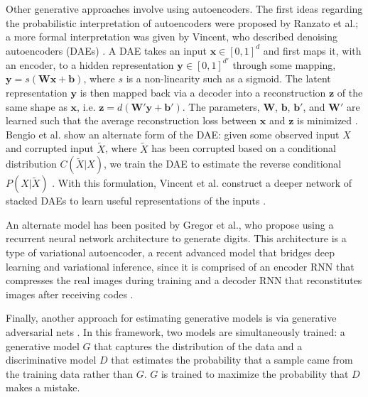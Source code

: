 \documentclass[10pt,twocolumn,letterpaper]{article}
\begin{document}
Other generative approaches involve using autoencoders. The first ideas regarding the probabilistic interpretation of autoencoders were proposed by Ranzato et al.; a more formal interpretation was given by Vincent, who described denoising autoencoders (DAEs) \cite{marc2007efficient} \cite{vincent2011connection}. A DAE takes an input $\mathbf{x} \in [0,1]^d$ and first maps it, with an encoder, to a hidden representation $\mathbf{y} \in [0,1]^{d'}$ through some mapping, $\mathbf{y} = s(\mathbf{W}\mathbf{x} + \mathbf{b})$, where $s$ is a non-linearity such as a sigmoid. The latent representation $\mathbf{y}$ is then mapped back via a decoder into a reconstruction $\mathbf{z}$ of the same shape as $\mathbf{x}$, i.e. $\mathbf{z} = d(\mathbf{W}'\mathbf{y} + \mathbf{b}')$. The parameters, $\mathbf{W}$, $\mathbf{b}$, $\mathbf{b}'$, and $\mathbf{W}'$ are learned such that the average reconstruction loss between $\mathbf{x}$ and $\mathbf{z}$ is minimized \cite{deep2016tutorial}. Bengio et al. show an alternate form of the DAE: given some observed input $X$ and corrupted input $\widetilde{X}$, where $\widetilde{X}$ has been corrupted based on a conditional distribution $C(\widetilde{X}|X)$, we train the DAE to estimate the reverse conditional $P(X|\widetilde{X})$ \cite{bengio2013generalized}. With this formulation, Vincent et al. construct a deeper network of stacked DAEs to learn useful representations of the inputs \cite{vincent2010stacked}.

An alternate model has been posited by Gregor et al., who propose using a recurrent neural network architecture to generate digits. This architecture is a type of variational autoencoder, a recent advanced model that bridges deep learning and variational inference, since it is comprised of an encoder RNN that compresses the real images during training and a decoder RNN that reconstitutes images after receiving codes \cite{gregor2015draw}. 

Finally, another approach for estimating generative models is via generative adversarial nets \cite{gauthier2014conditional} \cite{goodfellow2014generative}. In this framework, two models are simultaneously trained: a generative model $G$ that captures the distribution of the data and a discriminative model $D$ that estimates the probability that a sample came from the training data rather than $G$. $G$ is trained to maximize the probability that $D$ makes a mistake. 
\end{document}
